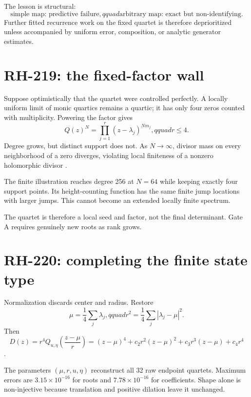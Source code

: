 \documentclass[12pt]{article}
\theoremstyle{remark}\newtheorem{remark}[theorem]{Remark}
\begin{document}
The lesson is structural:
\begin{equation}
 \text{simple map: predictive failure},qquad
 \text{arbitrary map: exact but non-identifying}.
\end{equation}
Further fitted recurrence work on the fixed quartet is therefore
deprioritized unless accompanied by uniform error, composition, or analytic
generator estimates.

\section{RH-219: the fixed-factor wall}

Suppose optimistically that the quartet were controlled perfectly.  A
locally uniform limit of monic quartics remains a quartic; it has only four
zeros counted with multiplicity.  Powering the factor gives
\begin{equation}
 Q(z)^N=\prod_{j=1}^{r}(z-\lambda_j)^{Nm_j},qquad r\le4.
\end{equation}
Degree grows, but distinct support does not.  As $N\to\infty$, divisor mass
on every neighborhood of a zero diverges, violating local finiteness of a
nonzero holomorphic divisor \citep{WangRH219,Conway1978}.

The finite illustration reaches degree 256 at $N=64$ while keeping exactly
four support points.  Its height-counting function has the same finite jump
locations with larger jumps.  This cannot become an extended locally finite
spectrum.

The quartet is therefore a local seed and factor, not the final determinant.
Gate A requires genuinely new roots as rank grows.

\section{RH-220: completing the finite state type}

Normalization discards center and radius.  Restore
\begin{equation}
 \mu=\frac14\sum_j\lambda_j,qquad
 r^2=\frac14\sum_j|\lambda_j-\mu|^2.
\end{equation}
Then
\begin{equation}\label{eq:gaugecomplete}
 D(z)=r^4Q_{u,\eta}\!\left(\frac{z-\mu}{r}\right)
 =(z-\mu)^4+c_2r^2(z-\mu)^2+c_3r^3(z-\mu)+c_4r^4
\end{equation}
\citep{WangRH220}.

The parameters $(\mu,r,u,\eta)$ reconstruct all 32 raw endpoint quartets.
Maximum errors are $3.15\times10^{-16}$ for roots and
$7.78\times10^{-16}$ for coefficients.  Shape alone is non-injective because
translation and positive dilation leave it unchanged.
\end{document}
